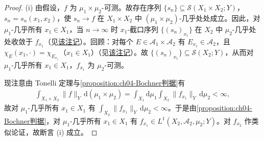 \documentclass[../../main.tex]{subfiles}%
\begin{document}
\begin{proof}
(i) 由假设，$f$ 为 $\mu_1\times\mu_2$-可测。故存在序列 $\{s_n\}\subseteq\mathcal{S}(X_1\times X_2;Y)$，$s_n=s_n(x_1,x_2)$，使 $s_n\to f$ 在 $X_1\times X_2$ 中 $(\mu_1\times\mu_2)$-几乎处处成立。因此，对 $\mu_1$-几乎所有 $x_1\in X_1$，当 $n\to\infty$ 时 $x_1$-截口序列 $\{(s_n)_{x_1}\}$ 在 $X_2$ 中 $\mu_2$-几乎处处收敛于 $f_{x_1}$（见\hyperref[remark:ch02-截口注]{该注记}）。回顾：对每个 $E\in\mathcal{A}_1\times\mathcal{A}_2$ 有 $E_{x_1}\in\mathcal{A}_2$，且 $\chi_E(x_1,\cdot)=\chi_{E_{x_1}}$（$x_1\in X_1$）（见\hyperref[remark:ch02-截口可测]{该注记}）。故 $\{(s_n)_{x_1}\}\subseteq\mathcal{S}(X_2;Y)$，从而对 $\mu_1$-几乎所有 $x_1\in X_1$，$f_{x_1}$ 为 $\mu_2$-可测。

现注意由 Tonelli 定理与\cref{proposition:ch04-Bochner判据}有
\begin{align*}
\int_{X_1\times X_2}\|f\|_Y\,\mathrm{d}(\mu_1\times\mu_2)=\int_{X_1}\mathrm{d}\mu_1\int_{X_2}\|f_{x_1}\|_Y\,\mathrm{d}\mu_2<\infty,
\end{align*}
故对 $\mu_1$-几乎所有 $x_1\in X_1$ 有 $\int_{X_2}\|f_{x_1}\|_Y\,\mathrm{d}\mu_2<\infty$。于是由\cref{proposition:ch04-Bochner判据}，对 $\mu_1$-几乎所有 $x_1\in X_1$ 有 $f_{x_1}\in L^1(X_2,\mathcal{A}_2,\mu_2;Y)$。对 $f_{x_2}$ 作类似论证，故断言 (i) 成立。


\end{proof}
\end{document}
